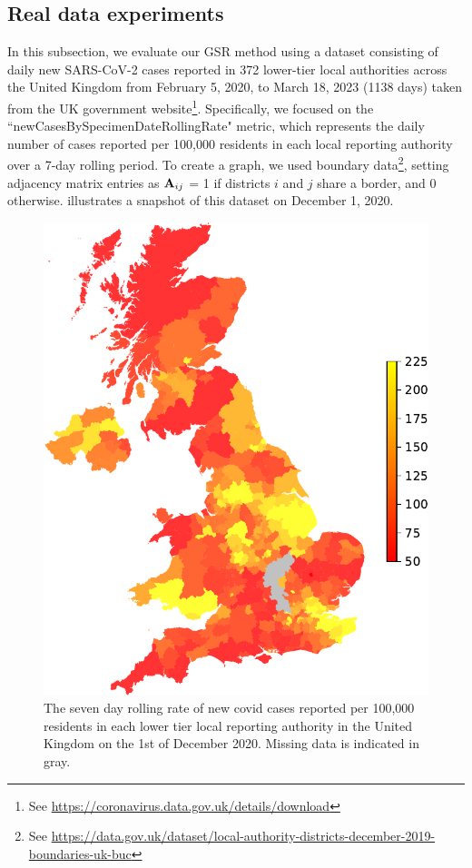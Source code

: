 \subsection{Real data experiments}

In this subsection, we evaluate our GSR method using a dataset consisting of daily new SARS-CoV-2 cases reported in 372 lower-tier local authorities across the United Kingdom from February 5, 2020, to March 18, 2023 (1138 days) taken from the UK government website\footnote{See \url{https://coronavirus.data.gov.uk/details/download}}. Specifically, we focused on the ``newCasesBySpecimenDateRollingRate" metric, which represents the daily number of cases reported per 100,000 residents in each local reporting authority over a 7-day rolling period. To create a graph, we used boundary data\footnote{See \url{https://data.gov.uk/dataset/local-authority-districts-december-2019-boundaries-uk-buc}}, setting adjacency matrix entries as $\mathbf{A}_{ij}$ = 1 if districts $i$ and $j$ share a border, and 0 otherwise.  illustrates a snapshot of this dataset on December 1, 2020.


\begin{figure}[b]
    \begin{center}
        \includegraphics[width=0.6\linewidth]{Figures/UK_covid.pdf}
    \end{center}
    \caption{\small{The seven day rolling rate of new covid cases reported per 100,000 residents in each lower tier local reporting authority in the United Kingdom on the 1st of December 2020. Missing data is indicated in gray.}}
    \label{fig:covid}
\end{figure}


